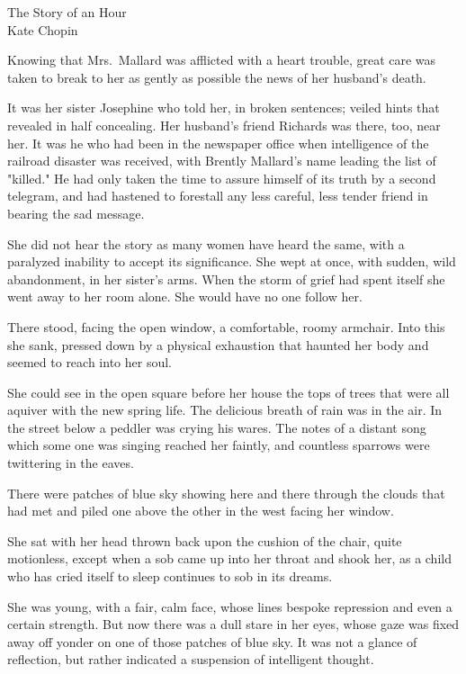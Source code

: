 \documentclass{article}        %
\begin{document}

\begin{center}
{\Large The Story of an Hour}\\
Kate Chopin
\end{center}

Knowing that Mrs.\ Mallard was afflicted with a heart trouble, great care was taken to break to her as gently as possible the news of her husband's death.

It was her sister Josephine who told her, in broken sentences; veiled hints that revealed in half concealing. Her husband's friend Richards was there, too, near her. It was he who had been in the newspaper office when intelligence of the railroad disaster was received, with Brently Mallard's name leading the list of "killed." He had only taken the time to assure himself of its truth by a second telegram, and had hastened to forestall any less careful, less tender friend in bearing the sad message.

She did not hear the story as many women have heard the same, with a paralyzed inability to accept its significance. She wept at once, with sudden, wild abandonment, in her sister's arms. When the storm of grief had spent itself she went away to her room alone. She would have no one follow her.

There stood, facing the open window, a comfortable, roomy armchair. Into this she sank, pressed down by a physical exhaustion that haunted her body and seemed to reach into her soul.

She could see in the open square before her house the tops of trees that were all aquiver with the new spring life. The delicious breath of rain was in the air. In the street below a peddler was crying his wares. The notes of a distant song which some one was singing reached her faintly, and countless sparrows were twittering in the eaves.

There were patches of blue sky showing here and there through the clouds that had met and piled one above the other in the west facing her window.

She sat with her head thrown back upon the cushion of the chair, quite motionless, except when a sob came up into her throat and shook her, as a child who has cried itself to sleep continues to sob in its dreams.

She was young, with a fair, calm face, whose lines bespoke repression and even a certain strength. But now there was a dull stare in her eyes, whose gaze was fixed away off yonder on one of those patches of blue sky. It was not a glance of reflection, but rather indicated a suspension of intelligent thought.
\end{document}
